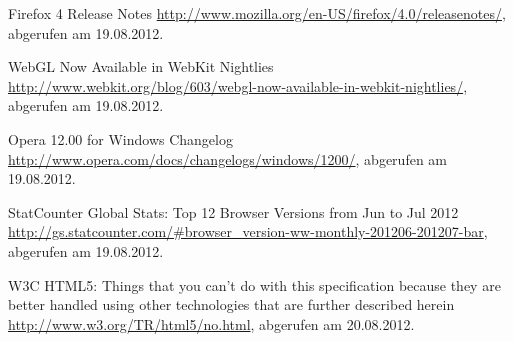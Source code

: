\begin{thebibliography}{99}
    Firefox 4 Release Notes
    \url{http://www.mozilla.org/en-US/firefox/4.0/releasenotes/}, abgerufen am 19.08.2012.

    WebGL Now Available in WebKit Nightlies
    \url{http://www.webkit.org/blog/603/webgl-now-available-in-webkit-nightlies/}, abgerufen am 19.08.2012.

    Opera 12.00 for Windows Changelog
    \url{http://www.opera.com/docs/changelogs/windows/1200/}, abgerufen am 19.08.2012.



    StatCounter Global Stats: Top 12 Browser Versions from Jun to Jul 2012
    \url{http://gs.statcounter.com/#browser_version-ww-monthly-201206-201207-bar}, abgerufen am 19.08.2012.




    W3C HTML5: Things that you can't do with this specification because they are better handled using other technologies that are further described herein
    \url{http://www.w3.org/TR/html5/no.html}, abgerufen am 20.08.2012.









\end{thebibliography}


